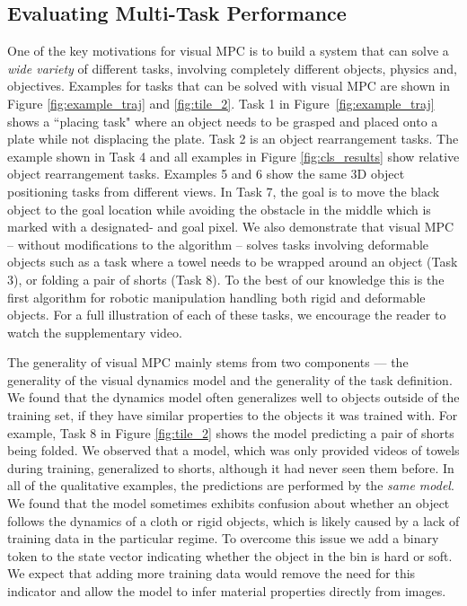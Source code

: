 \subsection{Evaluating Multi-Task Performance}
\label{subsec:multi_task_bench}
One of the key motivations for visual MPC is to build a system that can solve a \emph{wide variety} of different tasks, involving completely different objects, physics and, objectives.
Examples for tasks that can be solved with visual MPC are shown in Figure \ref{fig:example_traj} and \ref{fig:tile_2}. Task 1 in Figure~\ref{fig:example_traj} shows a ``placing task" where an object needs to be grasped and placed onto a plate while not displacing the plate. Task 2 is an object rearrangement tasks. The example shown in Task 4 and all examples in Figure \ref{fig:cls_results} show relative object rearrangement tasks. Examples 5 and 6 show the same 3D object positioning tasks from different views. In Task 7, the goal is to move the black object to the goal location while avoiding the obstacle in the middle which is marked with a designated- and goal pixel. We also demonstrate that visual MPC -- without modifications to the algorithm -- solves tasks involving deformable objects such as a task where a towel needs to be wrapped around an object (Task 3), or folding a pair of shorts (Task 8). To the best of our knowledge this is the first algorithm for robotic manipulation handling both rigid and deformable objects.
For a full illustration of each of these tasks, we encourage the reader to watch the supplementary video.

The generality of visual MPC mainly stems from two components --- the generality of the visual dynamics model and the generality of the task definition.
We found that the dynamics model often generalizes well to objects outside of the training set, if they have similar properties to the objects it was trained with. For example, Task 8 in Figure \ref{fig:tile_2} shows the model predicting a pair of shorts being folded. We observed that a model, which was only provided videos of towels during training, generalized to shorts, although it had never seen them before. In all of the qualitative examples, the predictions are performed by the \emph{same model}.
We found that the model sometimes exhibits confusion about whether an object follows the dynamics of a cloth or rigid objects, which is likely caused by a lack of training data in the particular regime. To overcome this issue we add a binary token to the state vector indicating whether the object in the bin is hard or soft. 
We expect that adding more training data would remove the need for this indicator and allow the model to infer material properties directly from images.

